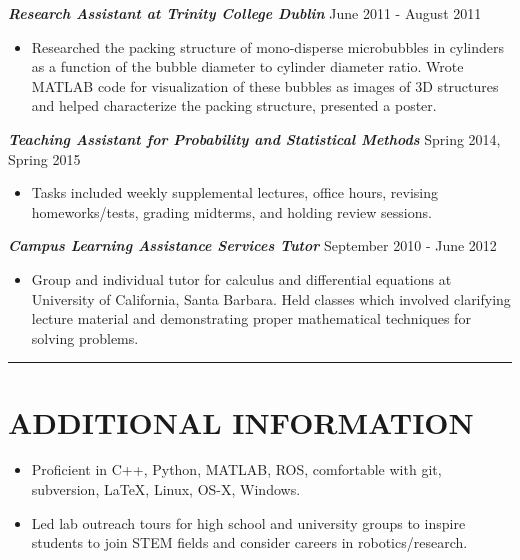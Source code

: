 \documentclass{res}
\begin{document}
\begin{resume}
\vspace*{-1ex}
{\sl \bf Research Assistant at Trinity College Dublin} \hfill June 2011 - August 2011
\vspace*{.5ex}
\begin{itemize}
\item Researched the packing structure of mono-disperse microbubbles in cylinders as a function of the bubble diameter to cylinder diameter ratio. Wrote MATLAB code for visualization of these bubbles as images of 3D structures and helped characterize the packing structure, presented a poster.
\end{itemize}
\vspace*{-1ex}
{\sl \bf Teaching Assistant for Probability and Statistical Methods} \hfill Spring 2014, Spring 2015
\vspace*{.5ex}
\begin{itemize}
\item Tasks included weekly supplemental lectures, office hours, revising homeworks/tests, grading midterms, and holding review sessions.
\end{itemize}
\vspace*{-1ex}
{\sl \bf Campus Learning Assistance Services Tutor} \hfill September 2010 - June 2012
\vspace*{.5ex}
\begin{itemize}
\item Group and individual tutor for calculus and differential equations at University of California, Santa Barbara. Held classes which involved clarifying lecture material and demonstrating proper mathematical techniques for solving problems.
\end{itemize}
\vspace*{-3ex}
\hspace{-8.5ex}\rule{16.5cm}{0.4pt}
\vspace*{-3ex}

\section{ADDITIONAL INFORMATION}
\vspace{3ex}
\begin{itemize}
\item Proficient in C++, Python, MATLAB, ROS, comfortable with git, subversion, LaTeX, Linux, OS-X, Windows.
\item Led lab outreach tours for high school and university groups to inspire students to join STEM fields and consider careers in robotics/research.
\end{itemize}



\end{resume}
\end{document}
